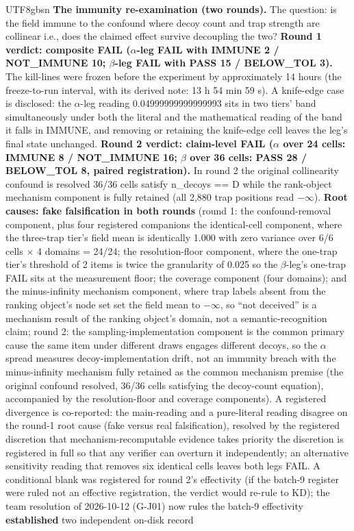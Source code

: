 \documentclass[11pt,letterpaper]{article}
\begin{document}
\begin{CJK}{UTF8}{gbsn}
\textbf{The immunity re-examination (two rounds).} The question: is the field immune to the confound where decoy count and trap strength are collinear \textemdash{} i.e., does the claimed effect survive decoupling the two? \textbf{Round 1 verdict: composite FAIL (\ensuremath{\alpha}-leg FAIL with IMMUNE 2 / NOT\_IMMUNE 10; \ensuremath{\beta}-leg FAIL with PASS 15 / BELOW\_TOL 3).} The kill-lines were frozen before the experiment by approximately 14 hours (the freeze-to-run interval, with its derived note: 13 h 54 min 59 s). A knife-edge case is disclosed: the \ensuremath{\alpha}-leg reading 0.04999999999999993 sits in two tiers' band simultaneously \textemdash{} under both the literal and the mathematical reading of the band it falls in IMMUNE, and removing or retaining the knife-edge cell leaves the leg's final state unchanged. \textbf{Round 2 verdict: claim-level FAIL (\ensuremath{\alpha} over 24 cells: IMMUNE 8 / NOT\_IMMUNE 16; \ensuremath{\beta} over 36 cells: PASS 28 / BELOW\_TOL 8, paired registration).} In round 2 the original collinearity confound is resolved \textemdash{} 36/36 cells satisfy n\_decoys == D \textemdash{} while the rank-object mechanism component is fully retained (all 2,880 trap positions read \ensuremath{-}\ensuremath{\infty}). \textbf{Root causes: fake falsification in both rounds} (round 1: the confound-removal component, plus four registered companions \textemdash{} the identical-cell component, where the three-trap tier's field mean is identically 1.000 with zero variance over 6/6 cells \ensuremath{\times} 4 domains = 24/24; the resolution-floor component, where the one-trap tier's threshold of 2 items is twice the granularity of 0.025 so the \ensuremath{\beta}-leg's one-trap FAIL sits at the measurement floor; the coverage component (four domains); and the minus-infinity mechanism component, where trap labels absent from the ranking object's node set set the field mean to \ensuremath{-}\ensuremath{\infty}, so ``not deceived'' is a mechanism result of the ranking object's domain, not a semantic-recognition claim; round 2: the sampling-implementation component is the common primary cause \textemdash{} the same item under different draws engages different decoys, so the \ensuremath{\alpha} spread measures decoy-implementation drift, not an immunity breach \textemdash{} with the minus-infinity mechanism fully retained as the common mechanism premise (the original confound resolved, 36/36 cells satisfying the decoy-count equation), accompanied by the resolution-floor and coverage components). A registered divergence is co-reported: the main-reading and a pure-literal reading disagree on the round-1 root cause (fake versus real falsification), resolved by the registered discretion that mechanism-recomputable evidence takes priority \textemdash{} the discretion is registered in full so that any verifier can overturn it independently; an alternative sensitivity reading that removes six identical cells leaves both legs FAIL. A conditional blank was registered for round 2's effectivity (if the batch-9 register were ruled not an effective registration, the verdict would re-rule to KD); the team resolution of 2026-10-12 (G-J01) now rules the batch-9 effectivity \textbf{established} \textemdash{} two independent on-disk record 
\end{CJK}
\end{document}
